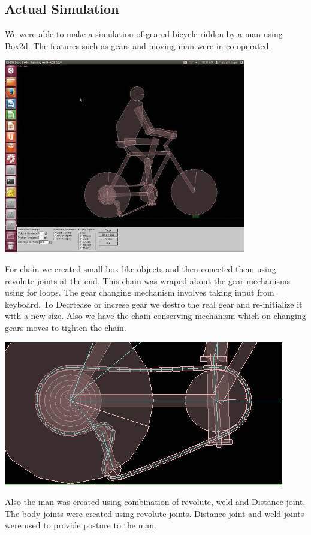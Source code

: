 \documentclass[11pt]{article}
\begin{document}
\subsection{Actual Simulation}
We were able to make a simulation of geared bicycle ridden by a man using Box2d. The features such as gears and moving man were in co-operated. \\
	\begin{center}
	\includegraphics[scale=0.6]{pic3}
	\end{center}
For chain we created small box like objects and then conected them using revolute joints at the end. This chain was wraped about the gear mechanisms using for loops. The gear changing mechanism involves taking input from keyboard. To Decrtease or increse gear we destro the real gear
 and re-initialize it with a new size. Also we have the chain conserving mechanism which on changing gears moves to tighten the chain.\\
\begin{center}
	\includegraphics[scale=0.4]{pic4}
	\end{center}
	 Also the man was created using combination of revolute, weld and Distance joint. The body joints were created using revolute joints. Distance joint and weld joints were used to provide posture to the man.\\
\end{document}
